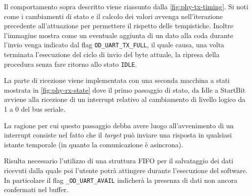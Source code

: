 Il comportamento sopra descritto viene riassunto dalla \cref{fig:phy-tx-timing}. Si noti come i cambiamenti di stato e il calcolo dei valori avvenga nell'iterazione precedente all'attuazione per permettere il rispetto delle tempistiche.
Inoltre l'immagine mostra come un eventuale aggiunta di un dato alla coda durante l'invio venga indicato dal flag \texttt{OD\_UART\_TX\_FULL}, il quale causa, una volta terminata l'esecuzione del ciclo di invio del byte attuale, la ripresa della procedura senza fare ritorno allo stato \texttt{IDLE}.

\begin{figure}[p]
    \checkoddpage%
    \ifoddpage%
    \else
    \fi
\end{figure}


La parte di ricezione viene implementata con una seconda macchina a stati mostrata in \cref{fig:phy-rx-state} dove il primo passaggio di stato, da Idle a StartBit avviene alla ricezione di un interrupt relativo al cambiamento di livello logico da 1 a 0 del bus seriale.

La ragione per cui questo passaggio debba avere luogo all'avvenimento di un interrupt consiste nel fatto che il \textit{target} può inviare una risposta in qualsiasi istante temporale (in quanto la comunicazione è asincrona).

Risulta necessario l'utilizzo di una struttura FIFO per il salvataggio dei dati ricevuti dalla quale poi l'utente potrà attingere durante l'esecuzione del software. In particolare il flag \texttt{\_OD\_UART\_AVAIL} indicherà la presenza di dati non ancora confermati nel buffer.

